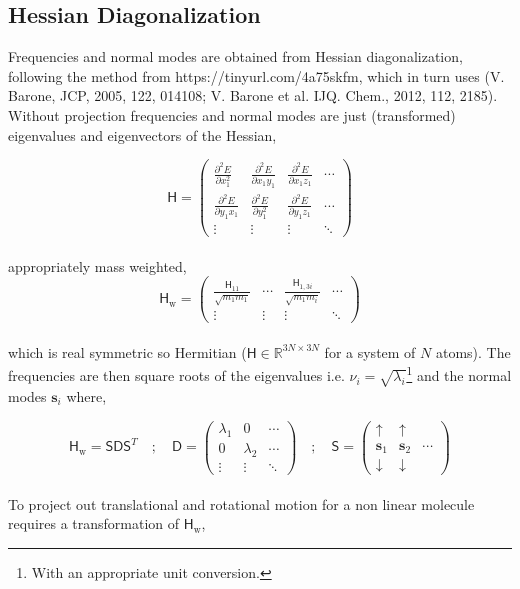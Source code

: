 \documentclass[10pt]{article}
\begin{document}
\subsection{Hessian Diagonalization}

Frequencies and normal modes are obtained from Hessian diagonalization, following the method from {\color{blue} https://tinyurl.com/4a75skfm}, which in turn uses (V. Barone, JCP, 2005, 122, 014108; V. Barone et al. IJQ. Chem., 2012, 112, 2185). Without projection frequencies and normal modes are just (transformed) eigenvalues and eigenvectors of the Hessian,

\begin{equation}
	\mathsf{H} = \begin{pmatrix}
		\frac{\partial^2 E}{\partial x_1^2} & \frac{\partial^2 E}{\partial x_1y_1} & 
		\frac{\partial^2 E}{\partial x_1z_1} & \cdots\\
		\frac{\partial^2 E}{\partial y_1x_1} & \frac{\partial^2 E}{\partial y_1^2} & 
		\frac{\partial^2 E}{\partial y_1z_1} & \cdots\\
		\vdots & \vdots & \vdots & \ddots
	\end{pmatrix}
\end{equation}
\\
appropriately mass weighted,
\begin{equation}
	\mathsf{H}_\text{w} = \begin{pmatrix}
		\frac{\mathsf{H}_{11}}{\sqrt{m_1 m_1}} & \cdots & \frac{\mathsf{H}_{1,3i}}{\sqrt{m_1 m_i}} & \cdots \\
		\vdots & \vdots & \vdots & \ddots
	\end{pmatrix}
\end{equation}
\\
which is real symmetric so Hermitian ($\mathsf{H} \in \mathbb{R}^{3N\times3N}$ for a system of $N$ atoms). The frequencies are then square roots of the eigenvalues i.e. $\nu_i = \sqrt{\lambda_i}$\footnote{With an appropriate unit conversion.} and the normal modes $\boldsymbol{s}_i$ where,

\begin{equation}
	\mathsf{H}_\text{w} = \mathsf{S D S}^T \quad ; \quad \mathsf{D} = \begin{pmatrix}
		\lambda_1 & 0  & \cdots \\
		0 & \lambda_2 & \cdots \\
		\vdots & \vdots & \ddots
	\end{pmatrix}
	\quad ; \quad
	\mathsf{S} = \begin{pmatrix}
		\uparrow & \uparrow &  \\
		\boldsymbol{s}_1 & \boldsymbol{s}_2 & \cdots \\
		\downarrow & \downarrow & 
	\end{pmatrix}
\end{equation}
\\
To project out translational and rotational motion for a non linear molecule requires a transformation of $\mathsf{H}_\text{w}$,
\end{document}
